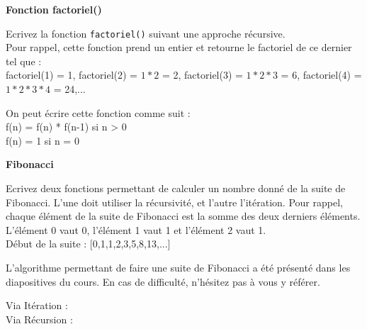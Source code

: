 	\begin{Exercice}[10 minutes] \textbf{Fonction factoriel()} 
	
	Ecrivez la fonction \lstinline{factoriel()} suivant une approche récursive. \\ 
	
	Pour rappel, cette fonction prend un entier et retourne le factoriel de ce dernier tel que : \\
	
	factoriel(1) = 1, factoriel(2) = $1*2$ = 2, factoriel(3) = $1*2*3$ = 6, factoriel(4) = $1*2*3*4$ = 24,...
	  
	
		\begin{conseil} 
		On peut écrire cette fonction comme suit : \\
		
		f(n) = f(n) * f(n-1) si n > 0 \\
		
		f(n) = 1 si n = 0
		
		\end{conseil} 
	
		\begin{solution} 
			
		\end{solution} 
	
	\end{Exercice}
	
	\begin{Exercice}[15 minutes] \textbf{Fibonacci} 
	
	Ecrivez deux fonctions permettant de calculer un nombre donné de la suite de Fibonacci. L'une doit utiliser la récursivité, et l'autre l'itération. Pour rappel, chaque élément de la suite de Fibonacci est la somme des deux derniers éléments. L'élément 0 vaut 0, l'élément 1 vaut 1 et l'élément 2 vaut 1. \\
	
	Début de la suite : [0,1,1,2,3,5,8,13,...]
	  
	
		\begin{conseil} 
			L'algorithme permettant de faire une suite de Fibonacci a été présenté dans les diapositives du cours. En cas de difficulté, n'hésitez pas à vous y référer.
		\end{conseil} 
	
		\begin{solution}
			Via Itération : \\
			
				 
				
			Via Récursion : \\
			
				
		\end{solution} 
	
	\end{Exercice}
    
    


